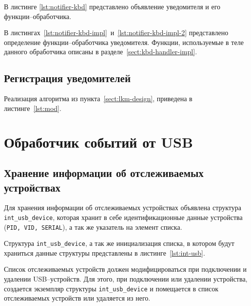 В листинге \ref{lst:notifier-kbd} представлено объявление уведомителя и его функции--обработчика.


В листингах~\ref{lst:notifier-kbd-impl}~и~\ref{lst:notifier-kbd-impl-2} представлено определение функции--обработчика уведомителя. Функции, используемые в теле данного обработчика описаны в разделе~\ref{sect:kbd-handler-impl}.



\subsection{Регистрация уведомителей}

Реализация алгоритма из пункта~\ref{sect:lkm-design}, приведена в листинге~\ref{lst:mod}.



\section{Обработчик событий от USB}

\subsection{Хранение информации об отслеживаемых устройствах}

Для хранения информации об отслеживаемых устройствах объявлена структура \texttt{int\_usb\_device}, которая хранит в себе идентификационные данные устройства (\texttt{PID, VID, SERIAL}), а так же указатель на элемент списка.

Структура \texttt{int\_usb\_device}, а так же инициализация списка, в котором будут храниться данные структуры представлены в листинге~\ref{lst:int-usb}.


Список отслеживаемых устройств должен модифицироваться при подключении и удалении USB--устройств. Для этого, при подключении или удалении устройства, создается экземпляр структуры \texttt{int\_usb\_device} и помещается в список отслеживаемых устройств или удаляется из него.

